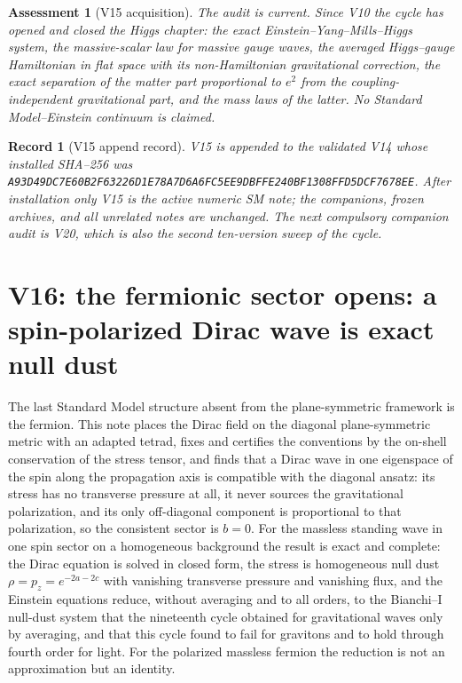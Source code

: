 \documentclass[11pt]{article}
\newtheorem{assessment}[theorem]{Assessment}
\newtheorem{record}[theorem]{Record}
\theoremstyle{remark}
\begin{document}
\begin{assessment}[V15 acquisition]
\label{ass:v20v15}
The audit is current.  Since V10 the cycle has opened and closed the
Higgs chapter: the exact Einstein--Yang--Mills--Higgs system, the
massive-scalar law for massive gauge waves, the averaged Higgs--gauge
Hamiltonian in flat space with its non-Hamiltonian gravitational
correction, the exact separation of the matter part proportional to
\(e^2\) from the coupling-independent gravitational part, and the
mass laws of the latter.  No Standard Model--Einstein continuum is
claimed.
\end{assessment}

\begin{record}[V15 append record]
\label{rec:v20v15}
V15 is appended to the validated V14 whose installed SHA--256 was
\texttt{A93D49DC7E60B2F63226D1E78A7D6A6FC5EE9DBFFE240BF1308FFD5DCF7678EE}.
After installation only V15 is the active numeric SM note; the
companions, frozen archives, and all unrelated notes are unchanged.
The next compulsory companion audit is V20, which is also the second
ten-version sweep of the cycle.
\end{record}


\section{V16: the fermionic sector opens: a spin-polarized Dirac wave is exact null dust}
\label{sec:v20v16}

The last Standard Model structure absent from the plane-symmetric
framework is the fermion.  This note places the Dirac field on the
diagonal plane-symmetric metric with an adapted tetrad, fixes and
certifies the conventions by the on-shell conservation of the
stress tensor, and finds that a Dirac wave in one eigenspace of the
spin along the propagation axis is compatible with the diagonal
ansatz: its stress has no transverse pressure at all, it never
sources the gravitational polarization, and its only off-diagonal
component is proportional to that polarization, so the consistent
sector is \(b=0\).  For the massless standing wave in one spin sector
on a homogeneous background the result is exact and complete: the
Dirac equation is solved in closed form, the stress is homogeneous
null dust \(\rho=p_z=e^{-2a-2c}\) with vanishing transverse pressure
and vanishing flux, and the Einstein equations reduce, without
averaging and to all orders, to the Bianchi--I null-dust system that
the nineteenth cycle obtained for gravitational waves only by
averaging, and that this cycle found to fail for gravitons and to
hold through fourth order for light.  For the polarized massless
fermion the reduction is not an approximation but an identity.
\end{document}
